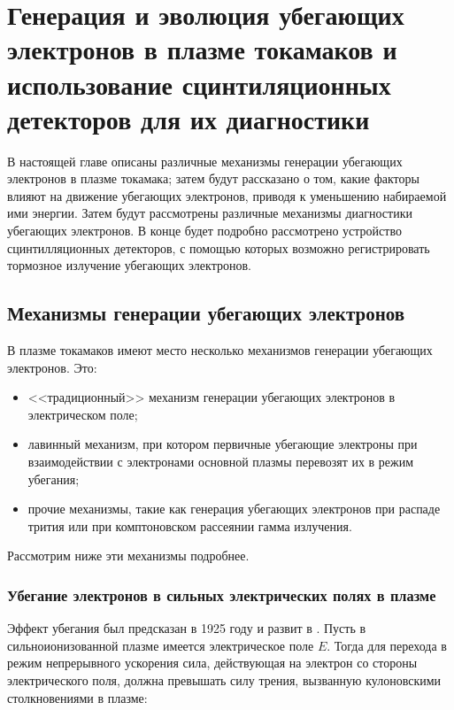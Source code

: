 

\chapter{Генерация и эволюция убегающих электронов в плазме токамаков и использование сцинтиляционных детекторов для их диагностики}
\label{sec:stateOfArt}

В настоящей главе описаны различные механизмы генерации убегающих электронов в плазме токамака; затем будут рассказано о том, какие факторы влияют на движение убегающих электронов, приводя к уменьшению набираемой ими энергии. Затем будут рассмотрены различные механизмы диагностики убегающих электронов. В конце будет подробно рассмотрено устройство сцинтилляционных детекторов, с помощью которых возможно регистрировать тормозное излучение убегающих электронов. 


\section{Механизмы генерации убегающих электронов}
\label{sec:electronsGeneration}

В плазме токамаков имеют место несколько механизмов генерации убегающих электронов. Это:

\begin{itemize}
  \item <<традиционный>> механизм генерации убегающих электронов в электрическом поле;
  \item лавинный механизм, при котором первичные убегающие электроны при взаимодействии с электронами основной плазмы перевозят их в режим убегания;
  \item прочие механизмы, такие как генерация убегающих электронов при распаде трития или при комптоновском рассеянии гамма излучения.
\end{itemize}

Рассмотрим ниже эти механизмы подробнее.


\subsection{Убегание электронов в сильных электрических полях в плазме}

Эффект убегания был предсказан в 1925 году \cite{Wilson1925} и развит в \cite{Dreicer1959}. Пусть в сильноионизованной плазме имеется электрическое поле $E$. Тогда для перехода в режим непрерывного ускорения сила, действующая на электрон со стороны электрического поля, должна превышать силу трения, вызванную кулоновскими столкновениями в плазме:

